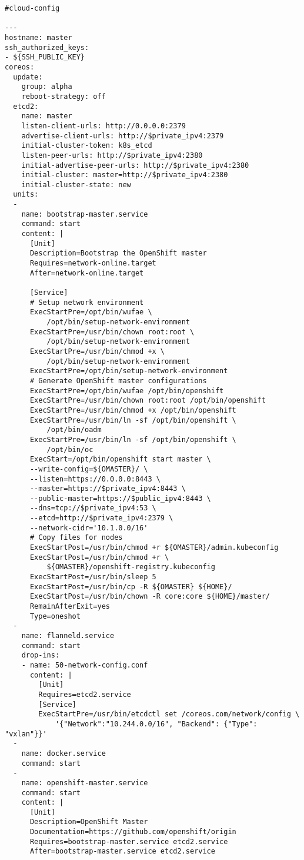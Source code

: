 \begin{verbatim}
#cloud-config

---
hostname: master
ssh_authorized_keys:
- ${SSH_PUBLIC_KEY}
coreos:
  update:
    group: alpha
    reboot-strategy: off
  etcd2:
    name: master
    listen-client-urls: http://0.0.0.0:2379
    advertise-client-urls: http://$private_ipv4:2379
    initial-cluster-token: k8s_etcd
    listen-peer-urls: http://$private_ipv4:2380
    initial-advertise-peer-urls: http://$private_ipv4:2380
    initial-cluster: master=http://$private_ipv4:2380
    initial-cluster-state: new
  units:
  -
    name: bootstrap-master.service
    command: start
    content: |
      [Unit]
      Description=Bootstrap the OpenShift master
      Requires=network-online.target
      After=network-online.target

      [Service]
      # Setup network environment
      ExecStartPre=/opt/bin/wufae \
          /opt/bin/setup-network-environment
      ExecStartPre=/usr/bin/chown root:root \
          /opt/bin/setup-network-environment
      ExecStartPre=/usr/bin/chmod +x \
          /opt/bin/setup-network-environment
      ExecStartPre=/opt/bin/setup-network-environment
      # Generate OpenShift master configurations
      ExecStartPre=/opt/bin/wufae /opt/bin/openshift
      ExecStartPre=/usr/bin/chown root:root /opt/bin/openshift
      ExecStartPre=/usr/bin/chmod +x /opt/bin/openshift
      ExecStartPre=/usr/bin/ln -sf /opt/bin/openshift \
          /opt/bin/oadm
      ExecStartPre=/usr/bin/ln -sf /opt/bin/openshift \
          /opt/bin/oc
      ExecStart=/opt/bin/openshift start master \
      --write-config=${OMASTER}/ \
      --listen=https://0.0.0.0:8443 \
      --master=https://$private_ipv4:8443 \
      --public-master=https://$public_ipv4:8443 \
      --dns=tcp://$private_ipv4:53 \
      --etcd=http://$private_ipv4:2379 \
      --network-cidr='10.1.0.0/16'
      # Copy files for nodes
      ExecStartPost=/usr/bin/chmod +r ${OMASTER}/admin.kubeconfig
      ExecStartPost=/usr/bin/chmod +r \
          ${OMASTER}/openshift-registry.kubeconfig
      ExecStartPost=/usr/bin/sleep 5
      ExecStartPost=/usr/bin/cp -R ${OMASTER} ${HOME}/
      ExecStartPost=/usr/bin/chown -R core:core ${HOME}/master/
      RemainAfterExit=yes
      Type=oneshot
  -
    name: flanneld.service
    command: start
    drop-ins:
    - name: 50-network-config.conf
      content: |
        [Unit]
        Requires=etcd2.service
        [Service]
        ExecStartPre=/usr/bin/etcdctl set /coreos.com/network/config \
            '{"Network":"10.244.0.0/16", "Backend": {"Type": "vxlan"}}'
  -
    name: docker.service
    command: start
  -
    name: openshift-master.service
    command: start
    content: |
      [Unit]
      Description=OpenShift Master
      Documentation=https://github.com/openshift/origin
      Requires=bootstrap-master.service etcd2.service
      After=bootstrap-master.service etcd2.service


\end{verbatim}
